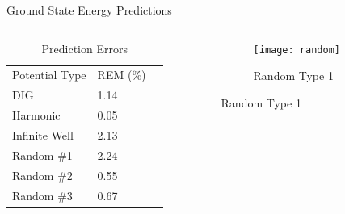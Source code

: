 \documentclass{beamer}
\begin{document}
\begin{frame}{Ground State Energy Predictions}
\begin{columns}
    \begin{column}{0.4\textwidth}
        \begin{table}[]
            \centering
            \caption{Prediction Errors}
            \begin{tabular}{lll}
            Potential Type & REM (\%) \\
            DIG            & 1.14     \\
            Harmonic       & 0.05     \\
            Infinite Well  & 2.13     \\
            Random \#1     & 2.24     \\
            Random \#2     & 0.55     \\
            Random \#3     & 0.67                    
            \end{tabular} 
        \end{table}
    \end{column}
    \begin{column}{0.8\textwidth}
    \graphicspath{{"../figs/training/"}}
    \begin{figure}[H]
        \begin{subfigure}[t]{0.80\textwidth}
            \texttt{[image: random]}
        \caption{Random Type 1}
        \end{subfigure}
    \end{figure}
    \end{column}
\end{columns}
\end{frame}
\end{document}
